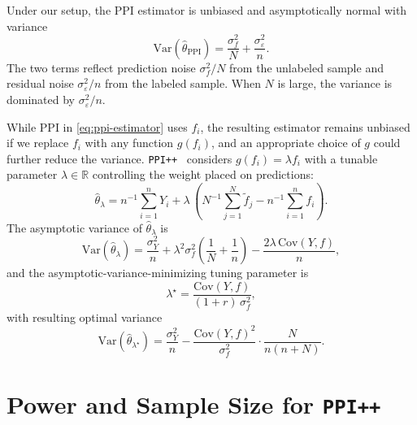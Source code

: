 \documentclass[12pt]{article}
\newcommand{\Var}{\mathrm{Var}}
\newcommand{\Cov}{\mathrm{Cov}}
\newcommand{\wh}{\widehat}
\newcommand{\wt}{\widetilde}
\begin{document}
\begin{proposition}\label{prop:ppi-var}\label{prop:ppi++-var}
Under our setup, the PPI estimator is unbiased and asymptotically normal with variance
\begin{equation}\label{eq:ppi-var}
  \Var(\wh{\theta}_{\mathrm{PPI}})
  = \frac{\sigma_f^2}{N} + \frac{\sigma_\varepsilon^2}{n}.
\end{equation}
The two terms reflect prediction noise $\sigma_f^2/N$ from the unlabeled sample and residual
noise $\sigma_\varepsilon^2/n$ from the labeled sample. When $N$ is large, the variance is dominated by $\sigma_\varepsilon^2/n$.

While PPI in \eqref{eq:ppi-estimator} uses $f_i$, the resulting estimator
remains unbiased if we replace $f_i$ with any function $g(f_i)$, and an
appropriate choice of $g$ could further reduce the variance.
\texttt{PPI++}~\citep{angelopoulos2023ppipp} considers $g(f_i) = \lambda f_i$
with a tunable parameter $\lambda \in \mathbb{R}$ controlling the weight placed
on predictions:
\begin{equation}\label{eq:ppi++-estimator}
  \wh{\theta}_\lambda = n^{-1}\sum_{i=1}^n Y_i + \lambda\,(N^{-1}\sum_{j=1}^N
  \wt{f}_j - n^{-1}\sum_{i=1}^n f_i).
\end{equation}
The asymptotic variance of $\wh{\theta}_\lambda$ is
\begin{equation}\label{eq:ppi++-variance}
  \Var(\wh{\theta}_\lambda)
  = \frac{\sigma_Y^2}{n}
  + \lambda^2\sigma_f^2\!\left(\frac{1}{N}+\frac{1}{n}\right)
  - \frac{2\lambda\,\Cov(Y,f)}{n},
\end{equation}
and the asymptotic-variance-minimizing tuning parameter is
\begin{equation}\label{eq:lambda-star}
  \lambda^\star = \frac{\Cov(Y,f)}{(1+r)\,\sigma_f^2},
\end{equation}
with resulting optimal variance
\begin{equation}\label{eq:ppi++-var-opt}
  \Var(\wh{\theta}_{\lambda^\star})
  = \frac{\sigma_Y^2}{n}
  - \frac{\Cov(Y,f)^2}{\sigma_f^2}\cdot\frac{N}{n(n+N)}.
\end{equation}
\end{proposition}


\section{Power and Sample Size for \texttt{PPI++}}
\label{sec:ppi-power-formula}\label{sec:ppi-power}\label{sec:ppi++}
\end{document}

